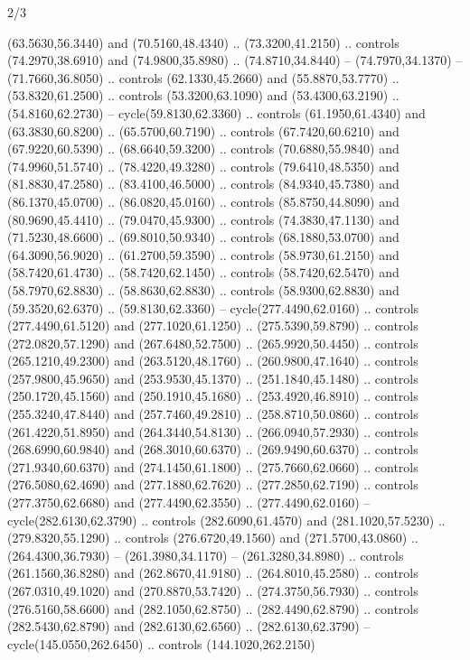 \begin{flagdescription}{2/3}
\begin{scope}[xshift=0.5\flaglength,yshift=0.5\flagwidth,scale=\stretchfactor]
\begin{scope}[scale=0.001645\flagwidth,yshift=65mm,xshift=-63mm]
\begin{scope}[y=0.80pt, x=0.80pt, yscale=-1,]
\begin{scope}[cm={{1.33333,0.0,0.0,1.33333,(0.0,1e-05)}}]
  (63.5630,56.3440) and (70.5160,48.4340) .. (73.3200,41.2150) .. controls
  (74.2970,38.6910) and (74.9800,35.8980) .. (74.8710,34.8440) --
  (74.7970,34.1370) -- (71.7660,36.8050) .. controls (62.1330,45.2660) and
  (55.8870,53.7770) .. (53.8320,61.2500) .. controls (53.3200,63.1090) and
  (53.4300,63.2190) .. (54.8160,62.2730) -- cycle(59.8130,62.3360) .. controls
  (61.1950,61.4340) and (63.3830,60.8200) .. (65.5700,60.7190) .. controls
  (67.7420,60.6210) and (67.9220,60.5390) .. (68.6640,59.3200) .. controls
  (70.6880,55.9840) and (74.9960,51.5740) .. (78.4220,49.3280) .. controls
  (79.6410,48.5350) and (81.8830,47.2580) .. (83.4100,46.5000) .. controls
  (84.9340,45.7380) and (86.1370,45.0700) .. (86.0820,45.0160) .. controls
  (85.8750,44.8090) and (80.9690,45.4410) .. (79.0470,45.9300) .. controls
  (74.3830,47.1130) and (71.5230,48.6600) .. (69.8010,50.9340) .. controls
  (68.1880,53.0700) and (64.3090,56.9020) .. (61.2700,59.3590) .. controls
  (58.9730,61.2150) and (58.7420,61.4730) .. (58.7420,62.1450) .. controls
  (58.7420,62.5470) and (58.7970,62.8830) .. (58.8630,62.8830) .. controls
  (58.9300,62.8830) and (59.3520,62.6370) .. (59.8130,62.3360) --
  cycle(277.4490,62.0160) .. controls (277.4490,61.5120) and (277.1020,61.1250)
  .. (275.5390,59.8790) .. controls (272.0820,57.1290) and (267.6480,52.7500) ..
  (265.9920,50.4450) .. controls (265.1210,49.2300) and (263.5120,48.1760) ..
  (260.9800,47.1640) .. controls (257.9800,45.9650) and (253.9530,45.1370) ..
  (251.1840,45.1480) .. controls (250.1720,45.1560) and (250.1910,45.1680) ..
  (253.4920,46.8910) .. controls (255.3240,47.8440) and (257.7460,49.2810) ..
  (258.8710,50.0860) .. controls (261.4220,51.8950) and (264.3440,54.8130) ..
  (266.0940,57.2930) .. controls (268.6990,60.9840) and (268.3010,60.6370) ..
  (269.9490,60.6370) .. controls (271.9340,60.6370) and (274.1450,61.1800) ..
  (275.7660,62.0660) .. controls (276.5080,62.4690) and (277.1880,62.7620) ..
  (277.2850,62.7190) .. controls (277.3750,62.6680) and (277.4490,62.3550) ..
  (277.4490,62.0160) -- cycle(282.6130,62.3790) .. controls (282.6090,61.4570)
  and (281.1020,57.5230) .. (279.8320,55.1290) .. controls (276.6720,49.1560)
  and (271.5700,43.0860) .. (264.4300,36.7930) -- (261.3980,34.1170) --
  (261.3280,34.8980) .. controls (261.1560,36.8280) and (262.8670,41.9180) ..
  (264.8010,45.2580) .. controls (267.0310,49.1020) and (270.8870,53.7420) ..
  (274.3750,56.7930) .. controls (276.5160,58.6600) and (282.1050,62.8750) ..
  (282.4490,62.8790) .. controls (282.5430,62.8790) and (282.6130,62.6560) ..
  (282.6130,62.3790) -- cycle(145.0550,262.6450) .. controls (144.1020,262.2150)

\end{scope}
\end{scope}
\end{scope}
\end{scope}
\end{flagdescription}
